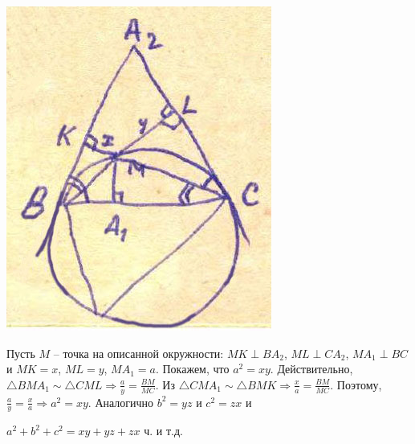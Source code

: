 \documentclass[12pt,a4paper]{article}
\begin{document}
\noindent \begin{minipage}{5cm}
	\includegraphics[width=\textwidth]{T_Fig_10.jpg}
\end{minipage}\quad 	
\begin{minipage}{8cm}
	Пусть $M$ -- точка на описанной окружности: $MK \perp BA_2$, 
	$ML \perp CA_2$, $MA_1 \perp BC$ и $MK=x$, $ML=y$, $MA_1=a$. Покажем, что $a^2=xy$. Действительно, $\bigtriangleup BMA_1\sim \bigtriangleup CML \Rightarrow	\frac{a}{y}=\frac{BM}{MC}$. Из $\bigtriangleup CMA_1\sim \bigtriangleup BMK \Rightarrow	\frac{x}{a}=\frac{BM}{MC}$. Поэтому, $\frac{a}{y}=\frac{x}{a} \Rightarrow a^2=xy$. Аналогично $b^2=yz$ и $c^2=zx$ и
	
	$a^2+b^2+c^2=xy+yz+zx$ ч. и т.д. 
	
\end{minipage}
\end{document}
